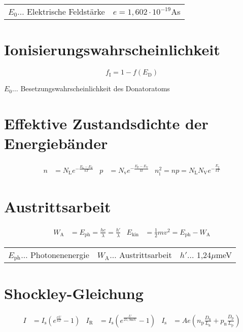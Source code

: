 		\begin{table}[h]
		\begin{tabular}{ll}
		$E_0\dots$ Elektrische Feldstärke & $e=1,602\cdot10^{-19}$As\\
		\end{tabular}
		\end{table}

	\section{Ionisierungswahrscheinlichkeit}
		\[
			f_{\text{I}}=1-f(E_{\text{D}})
		\]

		$E_0\dots$ Besetzungswahrscheinlichkeit des Donatoratoms

	\section{Effektive Zustandsdichte der Energiebänder}
		\begin{align*}
			n &= N_{\text{L}}e^{-\frac{E_{\text{L}}-E_{\text{F}}}{kT}} 
			& p &= N_{\text{v}}e^{-\frac{E_{\text{F}}-E_{\text{V}}}{kt}} 
			& n_{\text{i}}^2 = np = N_{\text{L}}N_{\text{V}}e^{-\frac{E_{\text{g}}}{kT}}
		\end{align*}

\clearpage

	\section{Austrittsarbeit}
		\begin{align*}
			W_{\mathrm{A}}&=E_{\mathrm{ph}}=\frac{hc}{\lambda}=\frac{h'}{\lambda} & E_{\mathrm{kin}}&=\frac{1}{2}mv^2=E_{\mathrm{ph}}-W_{\mathrm{A}}
		\end{align*}
		
		\begin{table}[h]
		\begin{tabular}{lll}
		$E_{\mathrm{ph}}\dots$ Photonenenergie & $W_{\mathrm{A}}\dots$ Austrittsarbeit & $h'\dots$ 1,24$\mu$meV \\
		\end{tabular}
		\end{table}
	
	\section{Shockley-Gleichung}
		\begin{align*}
			I&=I_{\mathrm{s}}\left(e^{\frac{eU}{kT}}-1\right) 
			& I_{\mathrm{R}}&=I_{\mathrm{s}}\left(e^{\frac{U}{25,9\mathrm{mV}}}-1\right) 
			& I_{\mathrm{s}}&=Ae\left(n_{\mathrm{p}}\frac{D_{\mathrm{n}}}{L_{\mathrm{n}}}+p_{\mathrm{n}}\frac{D_{\mathrm{p}}}{L_{\mathrm{p}}}\right)
		\end{align*}
	
